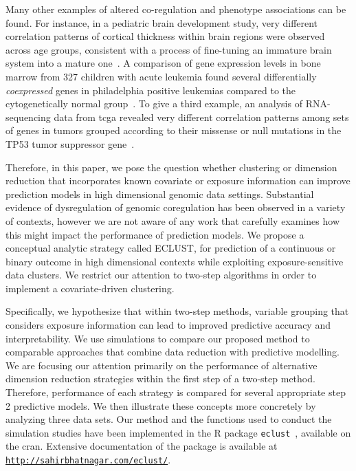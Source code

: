 

Many other examples of altered co-regulation and phenotype associations can be found.   For instance, in a pediatric brain development study, very different correlation patterns of cortical thickness within brain regions were observed across age groups, consistent with a process of fine-tuning an immature brain system into a mature one~\citep{khundrakpam2013developmental}.  A comparison of gene expression levels in bone marrow from 327 children with acute leukemia found several differentially \emph{coexpressed} genes in philadelphia positive leukemias compared to the cytogenetically normal group~\citep{kostka2004finding}.   To give a third example, an analysis of RNA-sequencing data from \ac{tcga} revealed very different correlation patterns among sets of genes in tumors grouped according to their missense or null mutations in the TP53 tumor suppressor gene~\citep{klein2016gene}. 

Therefore, in this paper, we pose the question whether clustering or dimension reduction that incorporates known covariate or exposure information can improve prediction models in high dimensional genomic data settings. Substantial evidence of dysregulation of genomic coregulation has been observed in a variety of contexts, however we are not aware of any work that carefully examines how this might impact the performance of prediction models. We propose a conceptual analytic strategy called ECLUST, for prediction of a continuous or binary outcome in high dimensional contexts while exploiting exposure-sensitive data clusters. We restrict our attention to two-step algorithms in order to implement a covariate-driven clustering. 

Specifically, we hypothesize that within two-step methods, variable grouping that considers exposure information can lead to improved predictive accuracy and interpretability. We use simulations to compare our proposed method to comparable  approaches that combine data reduction with predictive modelling. We are focusing our attention primarily on the performance of alternative dimension reduction strategies within the first step of a two-step method.  Therefore, performance of each strategy is compared for several appropriate step 2 predictive models. We then illustrate these concepts more concretely  by analyzing three data sets. Our method and the functions used to conduct the simulation studies have been implemented in the R package \texttt{eclust}~\citep{eclust}, available on the \ac{cran}. Extensive documentation of the package is available at \texttt{\url{http://sahirbhatnagar.com/eclust/}}.


